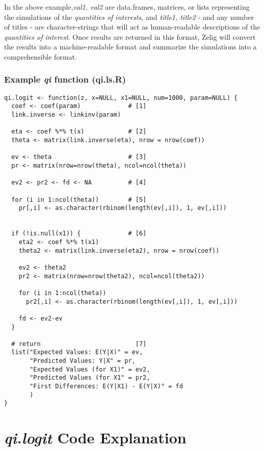 \documentclass[11pt]{article}
\begin{document}
In the above example,\emph{val1, val2} are data.frames, matrices, or lists representing the simulations of the \emph{quantities of interests}, and \emph{title1, title2} - and any number of titles - are character-strings that will act as human-readable descriptions of the \emph{quantities of interest}.  Once results are returned in this format, Zelig will convert the results into a machine-readable format and summarize the simulations into a comprehensible format.


\pagebreak

\subsubsection{Example \emph{qi} function (qi.ls.R)}


\begin{verbatim}
qi.logit <- function(z, x=NULL, x1=NULL, num=1000, param=NULL) {
  coef <- coef(param)             # [1]
  link.inverse <- linkinv(param)

  eta <- coef %*% t(x)            # [2]
  theta <- matrix(link.inverse(eta), nrow = nrow(coef))

  ev <- theta                     # [3]
  pr <- matrix(nrow=nrow(theta), ncol=ncol(theta))

  ev2 <- pr2 <- fd <- NA          # [4]

  for (i in 1:ncol(theta))        # [5]
    pr[,i] <- as.character(rbinom(length(ev[,i]), 1, ev[,i]))


  if (!is.null(x1)) {             # [6]
    eta2 <- coef %*% t(x1)
    theta2 <- matrix(link.inverse(eta2), nrow = nrow(coef))

    ev2 <- theta2
    pr2 <- matrix(nrow=nrow(theta2), ncol=ncol(theta2))

    for (i in 1:ncol(theta))
      pr2[,i] <- as.character(rbinom(length(ev[,i]), 1, ev[,i]))

    fd <- ev2-ev
  }

  # return                          [7]
  list("Expected Values: E(Y|X)" = ev,
       "Predicted Values: Y|X" = pr,
       "Expected Values (for X1)" = ev2,
       "Predicted Values (for X1" = pr2,
       "First Differences: E(Y|X1) - E(Y|X)" = fd
       )
}

\end{verbatim}

\section{\emph{qi.logit} Code Explanation}
\end{document}
